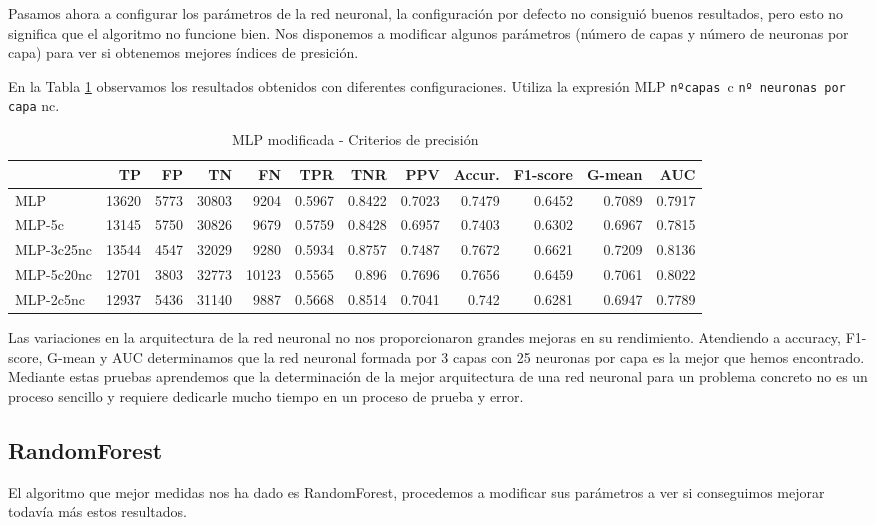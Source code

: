 \documentclass[a4paper, 20pt]{article}
\begin{document}
Pasamos ahora a configurar los parámetros de la red neuronal, la configuración por defecto no consiguió buenos resultados, pero esto no significa que el algoritmo no funcione bien. Nos disponemos a modificar algunos parámetros (número de capas y número de neuronas por capa) para ver si obtenemos mejores índices de presición.

En la Tabla \ref{tab:MLPmod} observamos los resultados obtenidos con diferentes configuraciones. Utiliza la expresión MLP \texttt{nºcapas }c \texttt{nº neuronas por capa} nc.

\begin{table}[H]
\centering
\caption{MLP modificada - Criterios de precisión}
\label{tab:MLPmod}
\begin{tabular}{lrrrrrrrrrrr}
\toprule
& TP & FP & TN & FN & TPR & TNR & PPV & Accur. & F1-score & G-mean & AUC\\ \midrule
MLP & 13620 & 5773 & 30803 & 9204 & 0.5967 & 0.8422 & 0.7023 & 0.7479 & 0.6452 & 0.7089 & 0.7917\\
MLP-5c & 13145 & 5750 & 30826 & 9679 & 0.5759 & 0.8428 & 0.6957 & 0.7403 & 0.6302 & 0.6967 & 0.7815\\
MLP-3c25nc & 13544 & 4547 & 32029 & 9280 & 0.5934 & 0.8757 & 0.7487 & 0.7672 & 0.6621 & 0.7209 & 0.8136\\
MLP-5c20nc & 12701 & 3803 & 32773 & 10123 & 0.5565 & 0.896 & 0.7696 & 0.7656 & 0.6459 & 0.7061 & 0.8022\\
MLP-2c5nc & 12937 & 5436 & 31140 & 9887 & 0.5668 & 0.8514 & 0.7041 & 0.742 & 0.6281 & 0.6947 & 0.7789\\
\bottomrule
\end{tabular}
\end{table}

Las variaciones en la arquitectura de la red neuronal no nos proporcionaron grandes mejoras en su rendimiento. Atendiendo a accuracy, F1-score, G-mean y AUC determinamos que la red neuronal formada por 3 capas con 25 neuronas por capa es la mejor que hemos encontrado. Mediante estas pruebas aprendemos que la determinación de la mejor arquitectura de una red neuronal para un problema concreto no es un proceso sencillo y requiere dedicarle mucho tiempo en un proceso de prueba y error.

\subsection{RandomForest}

El algoritmo que mejor medidas nos ha dado es RandomForest, procedemos a modificar sus parámetros a ver si conseguimos mejorar todavía más estos resultados.
\end{document}
